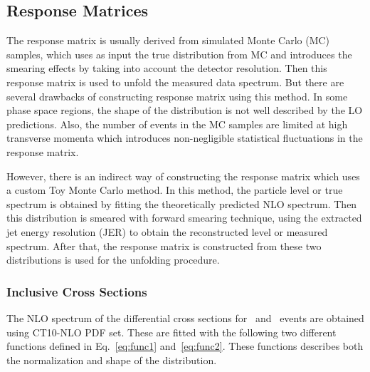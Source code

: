 \subsection{Response Matrices}
\label{sec:funcs}
The response matrix is usually derived from simulated Monte Carlo (MC) samples, which uses as input the true distribution from MC and introduces the smearing effects by taking into account the detector resolution. Then this response matrix is used to unfold the measured data spectrum. But there are several drawbacks of constructing response matrix using this method. In some phase space regions, the shape of the distribution is not well described by the LO predictions. Also, the number of events in the MC samples are limited at high transverse momenta which introduces non-negligible statistical fluctuations in the response matrix. 

However, there is an indirect way of constructing the response matrix which uses a custom Toy Monte Carlo method. In this method, the particle level or true \httwo spectrum is obtained by fitting the theoretically predicted NLO spectrum. Then this distribution is smeared with forward smearing technique, using the extracted jet energy resolution (JER) to obtain the reconstructed level or measured \httwo spectrum. After that, the response matrix is constructed from these two distributions is used for the unfolding procedure. 

\subsubsection{Inclusive Cross Sections}
\label{sec:cross_sec_res}
The NLO spectrum of the differential cross sections for \njt~and \njth~events are obtained using CT10-NLO PDF set. These are fitted with the following two different functions defined in Eq.~\ref{eq:func1} and~\ref{eq:func2}. These functions describes both the normalization and shape of the distribution.  

